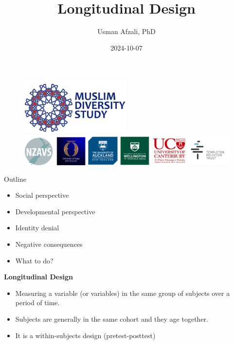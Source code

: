 \documentclass[
  ignorenonframetext,
  aspectratio=169,
]{beamer}
\title{Longitudinal Design}
\author{Usman Afzali, PhD}
\date{2024-10-07}
\providecommand{\tightlist}{%
  \setlength{\itemsep}{0pt}\setlength{\parskip}{0pt}}\usepackage{longtable,booktabs,array}
\begin{document}
\frame{\titlepage}

\begin{frame}
\begin{figure}

\begin{minipage}{\linewidth}
\begin{center}
\includegraphics[width=0.5\textwidth,height=\textheight]{figs/mds.png}
\end{center}
\includegraphics{figs/sponsors.png}\end{minipage}%

\end{figure}%
\end{frame}

\begin{frame}{Outline}
\label{outline}
\begin{itemize}
\tightlist
\item
  Social perspective
\item
  Developmental perspective
\item
  Identity denial
\item
  Negative consequences
\item
  What to do?
\end{itemize}
\end{frame}

\begin{frame}
\textbf{Longitudinal Design}

\begin{itemize}[<+->]
\tightlist
\item
  Measuring a variable (or variables) in the same group of subjects over
  a period of time.
\item
  Subjects are generally in the same cohort and they age together.
\item
  It is a within-subjects design (pretest-posttest)
\end{itemize}
\end{frame}
\end{document}
